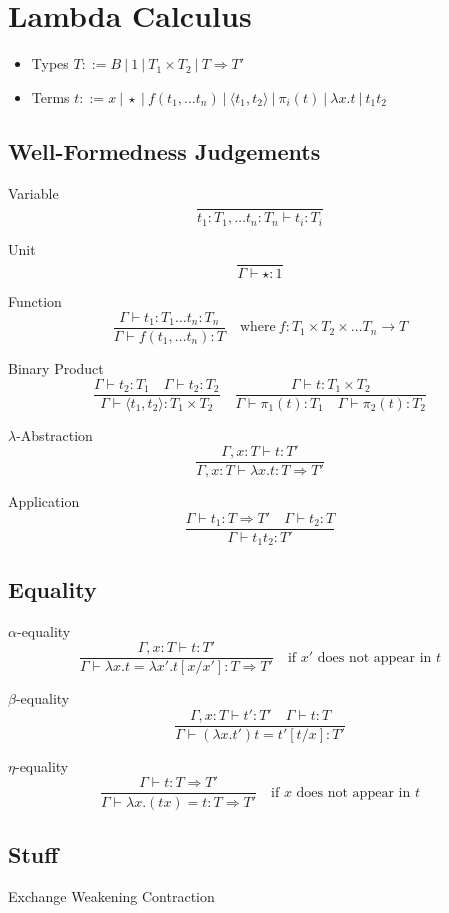 \documentclass{article}
\theoremstyle{definition}
\begin{document}
\section{Lambda Calculus}

\begin{itemize}
    \item Types
        $T ::= B 
        \ | \ 1
        \ | \ T_1 \times T_2
        \ | \ T \Rightarrow T \prime$
    \item Terms
        $t ::=  x
        \ |\ \star
        \ |\ f(t_1,\dots t_n)
        \ |\ \langle t_1, t_2 \rangle
        \ |\ \pi_i(t)
        \ |\ \lambda x.t
        \ |\ t_1 t_2$
\end{itemize}

\subsection{Well-Formedness Judgements}

Variable
$$
\frac{}{t_1 : T_1, \dots t_n : T_n \vdash t_i : T_i}
$$

Unit
$$
\frac{}{\Gamma \vdash \star : 1}
$$

Function
$$
\frac{\Gamma \vdash t_1 : T_1 \dots t_n : T_n}{\Gamma \vdash f(t_1,\dots t_n) : T}
\quad\textrm{where}\ f : T_1 \times T_2 \times \dots T_n \rightarrow T
$$

Binary Product
$$
\frac
{\Gamma \vdash t_2 : T_1 \quad \Gamma \vdash t_2 : T_2}
{\Gamma \vdash \langle t_1, t_2 \rangle : T_1 \times T_2}
\quad
\frac
{\Gamma \vdash t : T_1 \times T_2}
{\Gamma \vdash \pi_1(t) : T_1 \quad \Gamma \vdash \pi_2(t) : T_2}
$$

$\lambda$-Abstraction
$$
\frac
{\Gamma, x : T \vdash t : T\prime}
{\Gamma, x : T \vdash \lambda x.t : T \Rightarrow T\prime}
$$

Application
$$
\frac
{\Gamma \vdash t_1 : T \Rightarrow T\prime \quad \Gamma \vdash t_2 : T}
{\Gamma \vdash t_1 t_2 : T\prime}
$$

\subsection{Equality}
$\alpha$-equality
$$
\frac
{\Gamma, x : T \vdash t : T\prime}
{\Gamma \vdash \lambda x.t = \lambda x\prime.t[x/x\prime] : T \Rightarrow T\prime}
\quad
\textrm{if $x\prime$ does not appear in $t$}
$$

$\beta$-equality
$$
\frac
{\Gamma, x : T \vdash t\prime : T\prime \quad \Gamma \vdash t : T}
{\Gamma \vdash (\lambda x.t\prime)t = t\prime[t/x]: T\prime }
$$

$\eta$-equality
$$
\frac
{\Gamma \vdash t : T \Rightarrow T\prime}
{\Gamma \vdash \lambda x.(tx) = t : T \Rightarrow T\prime}
\quad
\textrm{if $x$ does not appear in $t$}
$$

\subsection{Stuff}
Exchange
Weakening
Contraction
\end{document}
